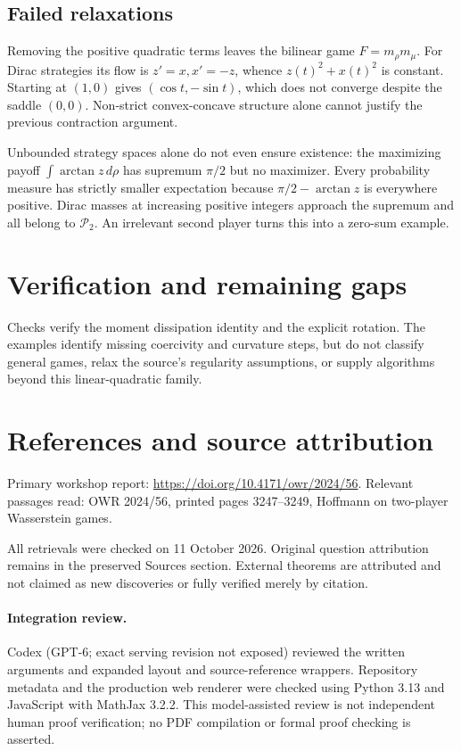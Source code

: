 \documentclass[11pt]{article}
\begin{document}
\subsection{Failed relaxations}
Removing the positive quadratic terms leaves the bilinear game $F=m_\rho m_\mu$. For Dirac strategies its flow is $z'=x,x'=-z$, whence $z(t)^2+x(t)^2$ is constant. Starting at $(1,0)$ gives $(\cos t,-\sin t)$, which does not converge despite the saddle $(0,0)$. Non-strict convex-concave structure alone cannot justify the previous contraction argument.

Unbounded strategy spaces alone do not even ensure existence: the maximizing payoff $\int\arctan z\,d\rho$ has supremum $\pi/2$ but no maximizer. Every probability measure has strictly smaller expectation because $\pi/2-\arctan z$ is everywhere positive. Dirac masses at increasing positive integers approach the supremum and all belong to $\mathcal P_2$. An irrelevant second player turns this into a zero-sum example.
\section{Verification and remaining gaps}
Checks verify the moment dissipation identity and the explicit rotation. The examples identify missing coercivity and curvature steps, but do not classify general games, relax the source's regularity assumptions, or supply algorithms beyond this linear-quadratic family.

\section{References and source attribution}
Primary workshop report: \url{https://doi.org/10.4171/owr/2024/56}. Relevant passages read: OWR 2024/56, printed pages 3247--3249, Hoffmann on two-player Wasserstein games.

All retrievals were checked on 11 October 2026. Original question attribution remains in the preserved Sources section. External theorems are attributed and not claimed as new discoveries or fully verified merely by citation.


\paragraph{Integration review.} Codex (GPT-6; exact serving revision not exposed) reviewed the written arguments and expanded layout and source-reference wrappers. Repository metadata and the production web renderer were checked using Python 3.13 and JavaScript with MathJax 3.2.2. This model-assisted review is not independent human proof verification; no PDF compilation or formal proof checking is asserted.
\end{document}
